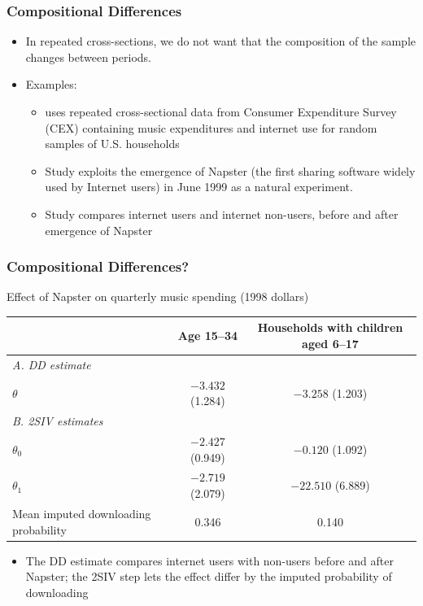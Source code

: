 \documentclass[xcolor=svgnames,9pt,english, aspectratio=169]{beamer}
\begin{document}
 
\begin{frame}
  \frametitle{Compositional Differences}

\begin{itemize}[<+->]\itemsep1em
  \item In repeated cross-sections, we do not want that the composition of the sample changes between periods.\medskip
\item Examples:
\begin{itemize}\itemsep0.5em
  \item \textcite{hong2013measuring} uses repeated cross-sectional data from Consumer Expenditure Survey (CEX) containing music expenditures and internet use for random samples of U.S. households\medskip
   \item Study exploits the emergence of Napster (the first sharing software widely used by Internet users) in June 1999 as a natural experiment.\medskip
  \item Study compares internet users and internet non-users, before and after emergence of Napster
\end{itemize}
\end{itemize}
\end{frame}

\begin{frame}
  \frametitle{Compositional Differences?}
\begin{center}
{\small Effect of Napster on quarterly music spending (1998 dollars)}\par\medskip
\begin{tabular}{lcc}
\toprule
& Age 15--34 & Households with children aged 6--17 \\ \midrule
\multicolumn{3}{l}{\emph{A. DD estimate}} \\
$\theta$ & $-3.432$ (1.284) & $-3.258$ (1.203) \\ \midrule
\multicolumn{3}{l}{\emph{B. 2SIV estimates}} \\
$\theta_0$ & $-2.427$ (0.949) & $-0.120$ (1.092) \\
$\theta_1$ & $-2.719$ (2.079) & $-22.510$ (6.889) \\
Mean imputed downloading probability & 0.346 & 0.140 \\
\bottomrule
\end{tabular}
\end{center}
\medskip
\begin{itemize}
\item<2-> The DD estimate compares internet users with non-users before and after Napster; the 2SIV step lets the effect differ by the imputed probability of downloading
\end{itemize}
\end{frame}
\end{document}
